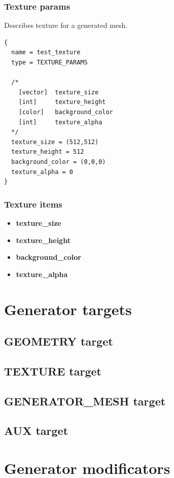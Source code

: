 \documentclass[9pt]{article}
\begin{document}
\subsubsection{Texture params}
Describes texture for a generated mesh.
\begin{verbatim}
{
  name = test_texture
  type = TEXTURE_PARAMS

  /*
    [vector]  texture_size
    [int]     texture_height
    [color]   background_color
    [int]     texture_alpha
  */
  texture_size = (512,512)  
  texture_height = 512
  background_color = (0,0,0)
  texture_alpha = 0
}
\end{verbatim}
\subsubsection*{Texture items}
\begin{itemize}
\item{\bf texture\_size}
\item{\bf texture\_height}
\item{\bf background\_color}
\item{\bf texture\_alpha}
\end{itemize}

\section{Generator targets}
\subsection{GEOMETRY target}
\subsection{TEXTURE target}
\subsection{GENERATOR\_MESH target}
\subsection{AUX target}

\section{Generator modificators}
\end{document}
